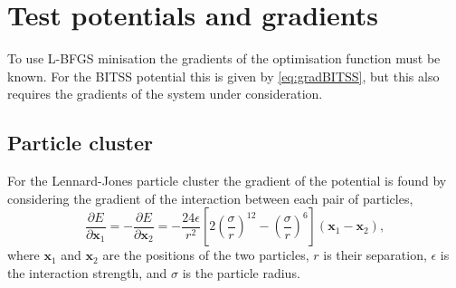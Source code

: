 \documentclass[aps,physrev,10pt]{revtex4-2}
\begin{document}
\section{Test potentials and gradients}
To use L-BFGS minisation the gradients of the optimisation function must be known.
For the BITSS potential this is given by \cref{eq:gradBITSS}, but this also requires the gradients of the system under consideration.

\subsection{Particle cluster}
For the Lennard-Jones particle cluster the gradient of the potential is found by considering the gradient of the interaction between each pair of particles,
\begin{equation}
  \frac{\partial E}{\partial \bm{x}_1} = -\frac{\partial E}{\partial \bm{x}_2} = - \frac{24 \epsilon}{r^2}
    \left[ 2 \left(\frac{\sigma}{r}\right)^{12} - \left(\frac{\sigma}{r}\right)^6 \right] (\bm{x}_1 - \bm{x}_2),
\end{equation}
where $\bm{x}_1$ and $\bm{x}_2$ are the positions of the two particles, $r$ is their separation, $\epsilon$ is the interaction strength, and $\sigma$ is the particle radius.
\end{document}
